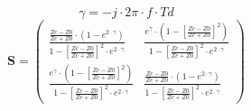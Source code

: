 \[ \gamma =  -j \cdot 2 \pi \cdot f \cdot Td \]
\[ \mathbf{S} = \left(\begin{array}{cc}  \frac{  \frac{ Zc-Z0 }{ Zc +
Z0 } \cdot \left( 1 - e^{2 \cdot \gamma }  \right) }{ 1 - \left[
\frac{ Zc-Z0 }{ Zc + Z0 } \right]^2 \cdot e^{2 \cdot \gamma }  } &
\frac{ e^{\gamma} \cdot \left( 1 - \left[  \frac{ Zc-Z0 }{ Zc + Z0 }
\right] ^2 \right) }{ 1 - \left[  \frac{ Zc-Z0 }{ Zc + Z0 } \right]^2
\cdot e^{2 \cdot \gamma }  }  \\  \frac{ e^{\gamma} \cdot \left( 1 -
\left[  \frac{ Zc-Z0 }{ Zc + Z0 } \right] ^2 \right) }{ 1 - \left[
\frac{ Zc-Z0 }{ Zc + Z0 } \right]^2 \cdot e^{2 \cdot \gamma }  }  &
\frac{  \frac{ Zc-Z0 }{ Zc + Z0 } \cdot \left( 1 - e^{2 \cdot \gamma }
\right) }{ 1 - \left[  \frac{ Zc-Z0 }{ Zc + Z0 } \right]^2 \cdot e^{2
\cdot \gamma }  } \end{array}\right) \]
